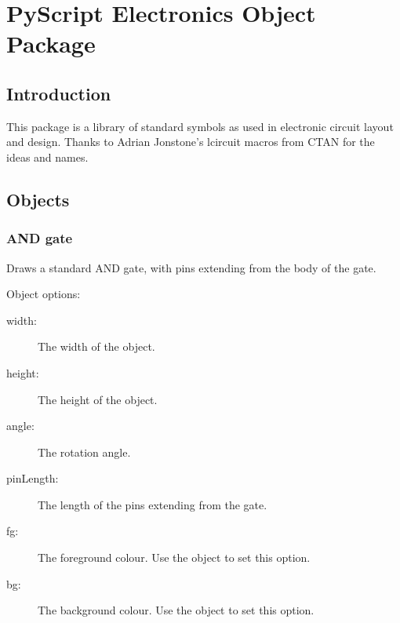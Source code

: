 % 
%
%


\chapter{PyScript Electronics Object Package}

\section{Introduction}

This package is a library of standard symbols as used in electronic circuit
layout and design.  Thanks to Adrian Jonstone's lcircuit macros from CTAN
for the ideas and names.

\section{Objects}

\subsection{AND gate}
Draws a standard AND gate, with pins extending from the body of the gate.

Object options:
\begin{description}
\item[width:] The width of the object.
\item[height:] The height of the object.
\item[angle:] The rotation angle.
\item[pinLength:] The length of the pins extending from the gate.
\item[fg:] The foreground colour.  Use the  object to set this
option.
\item[bg:] The background colour.  Use the  object to set this
option.
\end{description}


